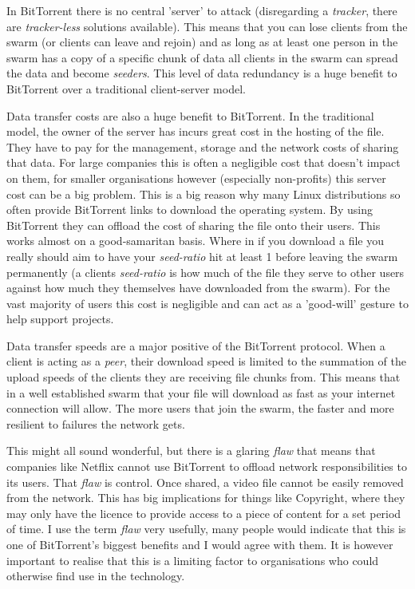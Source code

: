In BitTorrent there is no central 'server' to attack (disregarding a \textit{tracker}, there are \textit{tracker-less} solutions available). This means that you can lose clients from the swarm (or clients can leave and rejoin) and as long as at least one person in the swarm has a copy of a specific chunk of data all clients in the swarm can spread the data and become \textit{seeders}. This level of data redundancy is a huge benefit to BitTorrent over a traditional client-server model.

Data transfer costs are also a huge benefit to BitTorrent. In the traditional model, the owner of the server has incurs great cost in the hosting of the file. They have to pay for the management, storage and the network costs of sharing that data. For large companies this is often a negligible cost that doesn't impact on them, for smaller organisations however (especially non-profits) this server cost can be a big problem. This is a big reason why many Linux distributions so often provide BitTorrent links to download the operating system. By using BitTorrent they can offload the cost of sharing the file onto their users. This works almost on a good-samaritan basis. Where in if you download a file you really should aim to have your \textit{seed-ratio} hit at least 1 before leaving the swarm permanently (a clients \textit{seed-ratio} is how much of the file they serve to other users against how much they themselves have downloaded from the swarm). For the vast majority of users this cost is negligible and can act as a 'good-will' gesture to help support projects.

Data transfer speeds are a major positive of the BitTorrent protocol. When a client is acting as a \textit{peer}, their download speed is limited to the summation of the upload speeds of the clients they are receiving file chunks from. This means that in a well established swarm that your file will download as fast as your internet connection will allow. The more users that join the swarm, the faster and more resilient to failures the network gets.

This might all sound wonderful, but there is a glaring \textit{flaw} that means that companies like Netflix cannot use BitTorrent to offload network responsibilities to its users. That \textit{flaw} is control. Once shared, a video file cannot be easily removed from the network. This has big implications for things like Copyright, where they may only have the licence to provide access to a piece of content for a set period of time. I use the term \textit{flaw} very usefully, many people would indicate that this is one of BitTorrent's biggest benefits and I would agree with them. It is however important to realise that this is a limiting factor to organisations who could otherwise find use in the technology.

